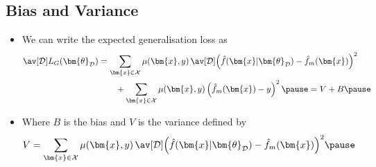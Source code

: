 \begin{slide}
\section[-2]{Bias and Variance}

\begin{PauseHighLight}
  \begin{itemize}
  \item We can write the expected generalisation loss as
    \begin{align*}
      \av[\mathcal{D}]{ L_G(\bm{\theta}_{\mathcal{D}}) }
      &= \sum_{\bm{x}\in\mathcal{X}} \mu(\bm{x},y)\, 
      \av[\mathcal{D}]{ \left(\hat{f}(\bm{x}\vert \bm{\theta}_{\mathcal{D}}) -
      \hat{f}_m(\bm{x})\right)^2 } \\
        & \quad \quad +
          \sum_{\bm{x}\in\mathcal{X}} \mu(\bm{x},y) \left( \hat{f}_m(\bm{x})
      - y \right)^2 \pause
        = V + B\pause
    \end{align*}
  \item Where $B$ is the bias and $V$ is the variance defined by
    \begin{align*}
      V = \sum_{\bm{x}\in\mathcal{X}} \mu(\bm{x},y)\,
      \av[\mathcal{D}]{ \left(\hat{f}(\bm{x}\vert \bm{\theta}_{\mathcal{D}}) -
      \hat{f}_m(\bm{x})\right)^2 }\pause 
    \end{align*}
  \end{itemize}
\end{PauseHighLight}

\end{slide}



